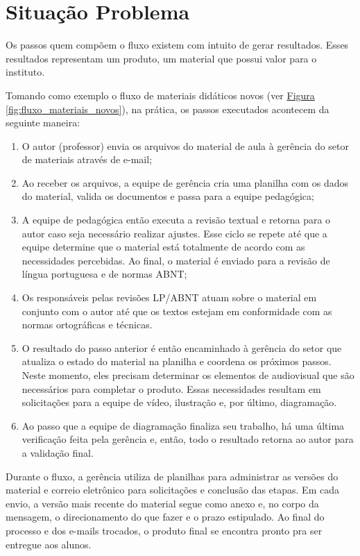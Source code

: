 \section{Situação Problema}

Os passos quem compõem o fluxo existem com intuito de gerar resultados. Esses resultados representam um produto, um material que possui valor para o instituto. 

Tomando como exemplo o fluxo de materiais didáticos novos (ver \hyperref[fig:fluxo_materiais_novos]{Figura \ref{fig:fluxo_materiais_novos}}), na prática, os passos executados acontecem da seguinte maneira:

\begin{enumerate}
  \item O autor (professor) envia os arquivos do material de aula à gerência do setor de materiais através de e-mail;
  \item Ao receber os arquivos, a equipe de gerência cria uma planilha com os dados do material, valida os documentos e passa para a equipe pedagógica;
  \item A equipe de pedagógica então executa a revisão textual e retorna para o autor caso seja necessário realizar ajustes. Esse ciclo se repete até que a equipe determine que o material está totalmente de acordo com as necessidades percebidas. Ao final, o material é enviado para a revisão de língua portuguesa e de normas ABNT;
  \item Os responsáveis pelas revisões LP/ABNT atuam sobre o material em conjunto com o autor até que os textos estejam em conformidade com as normas ortográficas e técnicas.
  \item O resultado do passo anterior é então encaminhado à gerência do setor que atualiza o estado do material na planilha e coordena os próximos passos. Neste momento, eles precisam determinar os elementos de audiovisual que são necessários para completar o produto. Essas necessidades resultam em solicitações para a equipe de vídeo, ilustração e, por último, diagramação. 
  \item Ao passo que a equipe de diagramação finaliza seu trabalho, há uma última verificação feita pela gerência e, então, todo o resultado retorna ao autor para a validação final.
\end{enumerate}

Durante o fluxo, a gerência utiliza de planilhas para administrar as versões do material e correio eletrônico para solicitações e conclusão das etapas. Em cada envio, a versão mais recente do material segue como anexo e, no corpo da mensagem, o direcionamento do que fazer e o prazo estipulado. Ao final do processo e dos e-mails trocados, o produto final se encontra pronto pra ser entregue aos alunos.

